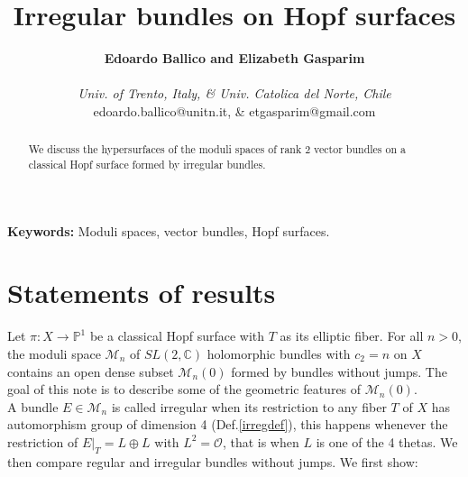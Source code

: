 \documentclass[
  a4paper, 
  reqno, 
  oneside, 
  11pt
]{amsart}
\theoremstyle{plain}	%
\theoremstyle{mydef} %
\theoremstyle{remark}
\theoremstyle{definition}
\theoremstyle{remark}
\begin{document}
\author{{\bf Edoardo Ballico and Elizabeth Gasparim}\\ \\
{\tiny \em Univ. of Trento, Italy, \& Univ. Catolica del Norte, Chile} \\ 
\tiny{edoardo.ballico@unitn.it, \& etgasparim@gmail.com}}

\address{}
\email{}
\title[Irregular bundles on Hopf surfaces]{Irregular bundles on Hopf surfaces}







\begin{abstract}
We discuss the hypersurfaces of the moduli spaces of rank $2$ vector bundles 
on a classical Hopf surface formed by irregular bundles.
\end{abstract}



\maketitle


\textbf{Keywords:} Moduli spaces, vector bundles, Hopf surfaces.

\tableofcontents

\section{Statements of results}
Let $\pi\colon X\to \mathbb P^1$ be a classical Hopf surface  with $T$ as its elliptic fiber. 
  For all $n>0$, the moduli space $\mathcal M_n$ 
  of $SL(2,\mathbb C)$  holomorphic bundles with $c_2=n$ 
  on $X$ contains an open dense subset $\mathcal M_n(0)$ formed by bundles without jumps. 
  The goal of this note is to describe some of the geometric features of 
  $\mathcal M_n(0)$. 
  \\

A bundle $E \in \mathcal M_n$ is called 
  irregular when its restriction to any fiber $T$ of $X$ has automorphism group of dimension 4
  (Def.\thinspace \ref{irregdef}), this happens whenever the restriction of $E\vert_T= L\oplus L$ 
  with $L^2=\mathcal O$, that is when $L$ is one of the 4 thetas. 
  We then compare regular and irregular bundles without jumps. We first show:
\end{document}
